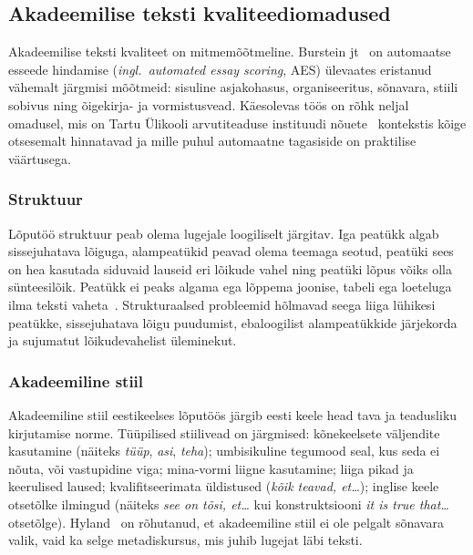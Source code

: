 \subsection{Akadeemilise teksti kvaliteediomadused} \label{taust:akadeemiline}

Akadeemilise teksti kvaliteet on mitmemõõtmeline. Burstein jt~\cite{burstein_aes_2013} on automaatse esseede hindamise (\emph{ingl.\ automated essay scoring}, AES) ülevaates eristanud vähemalt järgmisi mõõtmeid: sisuline asjakohasus, organiseeritus, sõnavara, stiili sobivus ning õigekirja- ja vormistusvead. Käesolevas töös on rõhk neljal omadusel, mis on Tartu Ülikooli arvutiteaduse instituudi nõuete~\cite{ut_juhend_2024} kontekstis kõige otsesemalt hinnatavad ja mille puhul automaatne tagasiside on praktilise väärtusega.

\subsubsection{Struktuur}

Lõputöö struktuur peab olema lugejale loogiliselt järgitav. Iga peatükk algab sissejuhatava lõiguga, alampeatükid peavad olema teemaga seotud, peatüki sees on hea kasutada siduvaid lauseid eri lõikude vahel ning peatüki lõpus võiks olla sünteesilõik. Peatükk ei peaks algama ega lõppema joonise, tabeli ega loeteluga ilma teksti vaheta~\cite{ut_juhend_2024}. Strukturaalsed probleemid hõlmavad seega liiga lühikesi peatükke, sissejuhatava lõigu puudumist, ebaloogilist alampeatükkide järjekorda ja sujumatut lõikudevahelist üleminekut.

\subsubsection{Akadeemiline stiil}

Akadeemiline stiil eestikeelses lõputöös järgib eesti keele head tava ja teadusliku kirjutamise norme. Tüüpilised stiilivead on järgmised: kõnekeelsete väljendite kasutamine (näiteks \emph{tüüp}, \emph{asi}, \emph{teha}); umbisikuline tegumood seal, kus seda ei nõuta, või vastupidine viga; mina-vormi liigne kasutamine; liiga pikad ja keerulised laused; kvalifitseerimata üldistused (\emph{kõik teavad, et\dots}); inglise keele otsetõlke ilmingud (näiteks \emph{see on tõsi, et\dots} kui konstruktsiooni \emph{it is true that\dots} otsetõlge). Hyland~\cite{hyland_metadiscourse_2005} on rõhutanud, et akadeemiline stiil ei ole pelgalt sõnavara valik, vaid ka selge metadiskursus, mis juhib lugejat läbi teksti.

